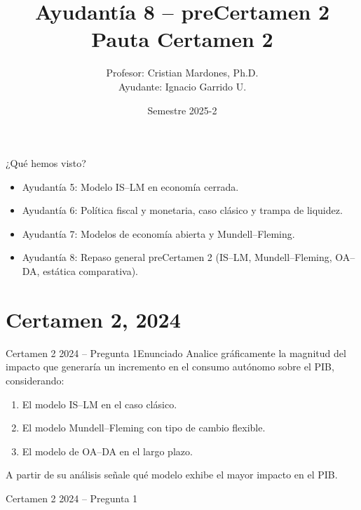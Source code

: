 \documentclass[aspectratio=169]{beamer}
\title[Ayudantía 8 -- preCertamen 2]{Ayudantía 8 -- preCertamen 2 \\ \small Pauta Certamen 2}
\author[Ignacio Garrido U.]{Profesor: Cristian Mardones, Ph.D. \\ Ayudante: Ignacio Garrido U.}
\institute[UdeC]{Facultad de Ingeniería \\ Depto. de Ingeniería Industrial \\ Macroeconomía (580323)}
\date[2025-2]{Semestre 2025-2}
\begin{document}
\begin{frame}
  \titlepage
\end{frame}

\begin{frame}{¿Qué hemos visto?}
  \begin{itemize}
    \item Ayudantía 5: Modelo IS--LM en economía cerrada.
    \item Ayudantía 6: Política fiscal y monetaria, caso clásico y trampa de liquidez.
    \item Ayudantía 7: Modelos de economía abierta y Mundell--Fleming.
    \item Ayudantía 8: Repaso general preCertamen 2 (IS--LM, Mundell--Fleming, OA--DA, estática comparativa).
  \end{itemize}
\end{frame}


\section{Certamen 2, 2024}

\begin{frame}{Certamen 2 2024 -- Pregunta 1}{Enunciado}
\small
Analice gráficamente la magnitud del impacto que generaría un incremento en el consumo autónomo sobre el PIB, considerando:
\begin{enumerate}
  \item El modelo IS--LM en el caso clásico.
  \item El modelo Mundell--Fleming con tipo de cambio flexible.
  \item El modelo de OA--DA en el largo plazo.
\end{enumerate}
\medskip
A partir de su análisis señale qué modelo exhibe el mayor impacto en el PIB.
\end{frame}

\begin{frame}{Certamen 2 2024 -- Pregunta 1}
  \vfill
  \centering
  \vfill
\end{frame}
\end{document}

